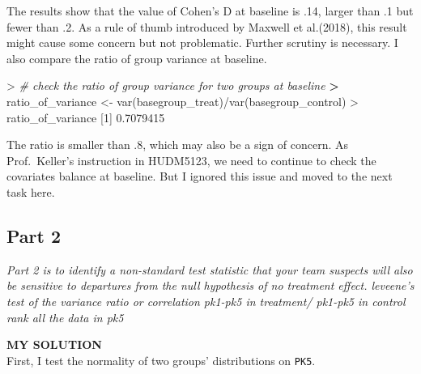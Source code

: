 \documentclass[
]{article}
\newenvironment{Shaded}{\begin{snugshade}}{\end{snugshade}}
\newcommand{\CommentTok}[1]{\textcolor[rgb]{0.56,0.35,0.01}{\textit{#1}}}
\newcommand{\DecValTok}[1]{\textcolor[rgb]{0.00,0.00,0.81}{#1}}
\newcommand{\ErrorTok}[1]{\textcolor[rgb]{0.64,0.00,0.00}{\textbf{#1}}}
\newcommand{\FloatTok}[1]{\textcolor[rgb]{0.00,0.00,0.81}{#1}}
\newcommand{\FunctionTok}[1]{\textcolor[rgb]{0.00,0.00,0.00}{#1}}
\newcommand{\NormalTok}[1]{#1}
\newcommand{\OtherTok}[1]{\textcolor[rgb]{0.56,0.35,0.01}{#1}}
\newcommand{\SpecialCharTok}[1]{\textcolor[rgb]{0.00,0.00,0.00}{#1}}
\begin{document}
The results show that the value of Cohen's D at baseline is .14, larger
than .1 but fewer than .2. As a rule of thumb introduced by Maxwell et
al.(2018), this result might cause some concern but not problematic.
Further scrutiny is necessary. I also compare the ratio of group
variance at baseline.

\begin{Shaded}
\begin{Highlighting}[]
\SpecialCharTok{\textgreater{}} \CommentTok{\# check the ratio of group variance for two groups at baseline}
\ErrorTok{\textgreater{}}\NormalTok{ ratio\_of\_variance }\OtherTok{\textless{}{-}} \FunctionTok{var}\NormalTok{(basegroup\_treat)}\SpecialCharTok{/}\FunctionTok{var}\NormalTok{(basegroup\_control)}
\SpecialCharTok{\textgreater{}}\NormalTok{ ratio\_of\_variance}
\NormalTok{[}\DecValTok{1}\NormalTok{] }\FloatTok{0.7079415}
\end{Highlighting}
\end{Shaded}

The ratio is smaller than .8, which may also be a sign of concern. As
Prof.~Keller's instruction in HUDM5123, we need to continue to check the
covariates balance at baseline. But I ignored this issue and moved to
the next task here.

\hypertarget{part-2}{%
\subsection{Part 2}\label{part-2}}

\emph{Part 2 is to identify a non-standard test statistic that your team
suspects will also be sensitive to departures from the null hypothesis
of no treatment effect. leveene's test of the variance ratio or
correlation pk1-pk5 in treatment/ pk1-pk5 in control rank all the data
in pk5}

\textbf{MY SOLUTION}\\
First, I test the normality of two groups' distributions on
\texttt{PK5}.
\end{document}
